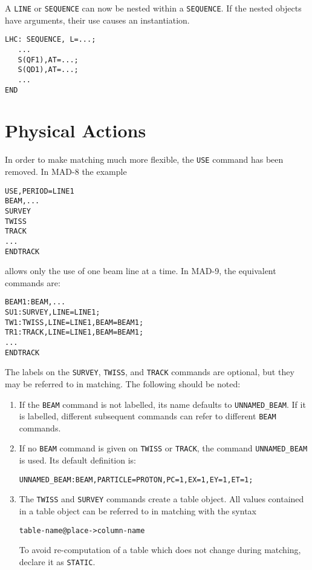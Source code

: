 \documentclass{article}
\begin{document}
A \texttt{LINE} or \texttt{SEQUENCE} can now be nested within a
\texttt{SEQUENCE}.
If the nested objects have arguments,
their use causes an instantiation.
\begin{verbatim}
LHC: SEQUENCE, L=...;
   ...
   S(QF1),AT=...;
   S(QD1),AT=...;
   ...
END
\end{verbatim}

\section{Physical Actions}
\label{sec:action}

In order to make matching much more flexible,
the \texttt{USE} command has been removed.
In MAD-8 the example
\begin{verbatim}
USE,PERIOD=LINE1
BEAM,...
SURVEY
TWISS
TRACK
...
ENDTRACK
\end{verbatim}
allows only the use of one beam line at a time.
In MAD-9, the equivalent commands are:
\begin{verbatim}
BEAM1:BEAM,...
SU1:SURVEY,LINE=LINE1;
TW1:TWISS,LINE=LINE1,BEAM=BEAM1;
TR1:TRACK,LINE=LINE1,BEAM=BEAM1;
...
ENDTRACK
\end{verbatim}
The labels on the \texttt{SURVEY}, \texttt{TWISS}, and \texttt{TRACK}
commands are optional, but they may be referred to in matching.
The following should be noted:
\begin{enumerate}
\item
  If the \texttt{BEAM} command is not labelled, its name defaults to
  \texttt{UNNAMED\_BEAM}. 
  If it is labelled, different subsequent commands can refer to
  different \texttt{BEAM} commands.
\item
  If no \texttt{BEAM} command is given on \texttt{TWISS} or
  \texttt{TRACK}, the command \texttt{UNNAMED\_BEAM} is used.
  Its default definition is:
  \begin{verbatim}
UNNAMED_BEAM:BEAM,PARTICLE=PROTON,PC=1,EX=1,EY=1,ET=1;
  \end{verbatim}
\item
  The \texttt{TWISS} and \texttt{SURVEY} commands create a table
  object.
  All values contained in a table object can be referred to in
  matching with the syntax
  \begin{verbatim}
table-name@place->column-name
  \end{verbatim}
  To avoid re-computation of a table which does not change during
  matching, declare it as \texttt{STATIC}.
\end{enumerate}

\printindex
\end{document}
